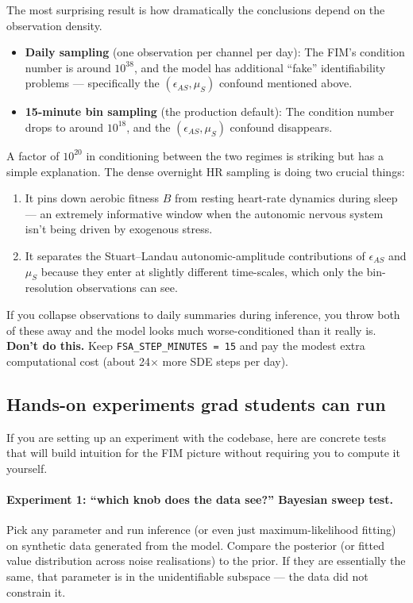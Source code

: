 The most surprising result is how dramatically the conclusions depend on the observation density.

\begin{itemize}
  \item \textbf{Daily sampling} (one observation per channel per day): The FIM's condition number is around $10^{38}$, and the model has additional ``fake'' identifiability problems --- specifically the $(\epsilon_{AS}, \mu_S)$ confound mentioned above.
  \item \textbf{15-minute bin sampling} (the production default): The condition number drops to around $10^{18}$, and the $(\epsilon_{AS}, \mu_S)$ confound disappears.
\end{itemize}

A factor of $10^{20}$ in conditioning between the two regimes is striking but has a simple explanation. The dense overnight HR sampling is doing two crucial things:
\begin{enumerate}
  \item It pins down aerobic fitness $B$ from resting heart-rate dynamics during sleep --- an extremely informative window when the autonomic nervous system isn't being driven by exogenous stress.
  \item It separates the Stuart--Landau autonomic-amplitude contributions of $\epsilon_{AS}$ and $\mu_S$ because they enter at slightly different time-scales, which only the bin-resolution observations can see.
\end{enumerate}

If you collapse observations to daily summaries during inference, you throw both of these away and the model looks much worse-conditioned than it really is. \textbf{Don't do this.} Keep \texttt{FSA\_STEP\_MINUTES = 15} and pay the modest extra computational cost (about 24$\times$ more SDE steps per day).

\subsection{Hands-on experiments grad students can run}

If you are setting up an experiment with the codebase, here are concrete tests that will build intuition for the FIM picture without requiring you to compute it yourself.

\paragraph{Experiment 1: ``which knob does the data see?'' Bayesian sweep test.}
Pick any parameter and run inference (or even just maximum-likelihood fitting) on synthetic data generated from the model. Compare the posterior (or fitted value distribution across noise realisations) to the prior. If they are essentially the same, that parameter is in the unidentifiable subspace --- the data did not constrain it.

